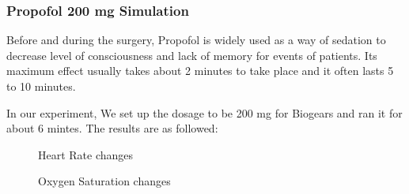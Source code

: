 \documentclass[a4paper]{article}
\begin{document}
\subsubsection{Propofol 200 mg Simulation}

Before and during the surgery, Propofol is widely used as a way of sedation to decrease level of consciousness and lack of memory for events of patients. Its maximum effect usually takes about 2 minutes to take place and it often lasts 5 to 10 minutes.

In our experiment, We set up the dosage to be 200 mg for Biogears and ran it for about 6 mintes. The results are as followed:

\begin{figure}[!htb]\centering
   \begin{minipage}{0.49\textwidth}
     \caption{Heart Rate changes}
     \label{fig:given 200 mg Propofol}
     
   \end{minipage}
   \begin {minipage}{0.49\textwidth}
     \caption{Oxygen Saturation changes}
     \label{fig:given 200 mg Propofol}
   \end{minipage}
\end{figure}
\end{document}
